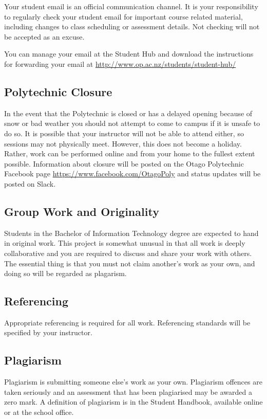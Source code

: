 \documentclass{article}
\begin{document}
Your student email is an official communication channel. It is your responsibility to regularly check your student email for important course related material, including changes to class scheduling or assessment details. Not checking will not be accepted as an excuse.

You can manage your email at the Student Hub and download the instructions for forwarding your email at \url{http://www.op.ac.nz/students/student-hub/}

\subsection*{Polytechnic Closure}
In the event that the Polytechnic is closed or has a delayed opening because of snow or bad weather you should not attempt to come to campus if it is unsafe to do so. It is possible that your instructor will not be able to attend either, so sessions may not physically meet. However, this does not become a holiday. Rather, work can be performed online and from your home to the fullest extent possible. Information about closure will be posted on the Otago Polytechnic Facebook page \url{https://www.facebook.com/OtagoPoly} and status updates will be posted on Slack.

\subsection*{Group Work and Originality}
Students in the Bachelor of Information Technology degree are expected to hand in original work.  This project is somewhat unusual in that all work is deeply collaborative and you are required to discuss and share your work with others. The essential thing is that you must not claim another's work as your own, and doing so will be regarded as plagarism.

\subsection*{Referencing}
Appropriate referencing is required for all work.  Referencing standards will be specified by your instructor.

\subsection*{Plagiarism}
Plagiarism is submitting someone else's work as your own.  Plagiarism offences are taken seriously and an
assessment that has been plagiarised may be awarded a zero mark.  A definition of plagiarism is in the Student Handbook,
available online or at the school office.
\end{document}

